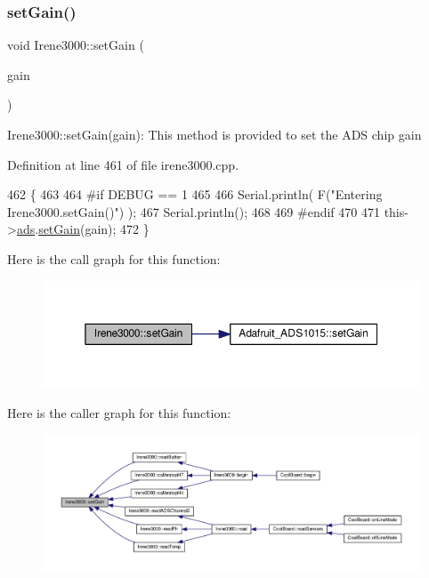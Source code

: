\subsubsection{\texorpdfstring{set\+Gain()}{setGain()}}
{\footnotesize\ttfamily void Irene3000\+::set\+Gain (\begin{DoxyParamCaption}\item[{\hyperlink{_cool_adafruit___a_d_s1015_8h_a3d6c0e15829a207b9155890811fa4781}{ads\+Gain\+\_\+t}}]{gain }\end{DoxyParamCaption})}

Irene3000\+::set\+Gain(gain)\+: This method is provided to set the A\+DS chip gain 

Definition at line 461 of file irene3000.\+cpp.


\begin{DoxyCode}
462 \{
463 
464 \textcolor{preprocessor}{#if DEBUG == 1  }
465 
466     Serial.println( F(\textcolor{stringliteral}{"Entering Irene3000.setGain()"}) );
467     Serial.println();
468 
469 \textcolor{preprocessor}{#endif}
470 
471     this->\hyperlink{class_irene3000_a1215e77ba761c9908d80d691f149e135}{ads}.\hyperlink{class_adafruit___a_d_s1015_a399441eace686975ff22937cbe45cc50}{setGain}(gain);
472 \}
\end{DoxyCode}
Here is the call graph for this function\+:\nopagebreak
\begin{figure}[H]
\begin{center}
\leavevmode
\includegraphics[width=350pt]{d6/d03/class_irene3000_aff7c5da186b388e7272e63ff88a20c34_cgraph}
\end{center}
\end{figure}
Here is the caller graph for this function\+:\nopagebreak
\begin{figure}[H]
\begin{center}
\leavevmode
\includegraphics[width=350pt]{d6/d03/class_irene3000_aff7c5da186b388e7272e63ff88a20c34_icgraph}
\end{center}
\end{figure}


